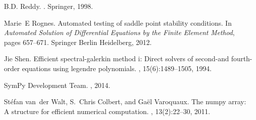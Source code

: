 \documentclass{marine_2015}
\begin{document}
\begin{thebibliography}{10}
B.D. Reddy.
.
\newblock Springer, 1998.

Marie~E Rognes.
\newblock Automated testing of saddle point stability conditions.
\newblock In {\em Automated Solution of Differential Equations by the Finite
  Element Method}, pages 657--671. Springer Berlin Heidelberg, 2012.

Jie Shen.
\newblock Efficient spectral-galerkin method i: Direct solvers of second-and
  fourth-order equations using legendre polynomials.
, 15(6):1489--1505, 1994.

{SymPy Development Team}.
, 2014.

Stéfan van~der Walt, S.~Chris Colbert, and Gaël Varoquaux.
\newblock The numpy array: A structure for efficient numerical computation.
, 13(2):22--30, 2011.

\end{thebibliography}
\end{document}
